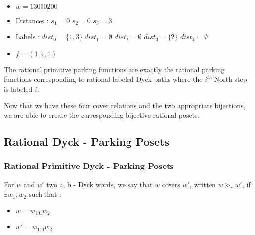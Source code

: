 \begin{example}[$a < b : a = 3, b = 5,
    \mathcal{LR}_{a,b} \to \mathcal{PF}_{a,b}$]
    ~\
    \begin{itemize}
        \item $w = 13000200$
    \end{itemize}
    
    \begin{itemize}
        \item Distances :
            \subitem $s_1 = 0$
            \hspace{2cm} $s_2 = 0$
            \hspace{2cm} $s_3 = 3$
        \item Labels :
            \subitem $dist_0 = \{1, 3\}$
            \hspace{2cm} $dist_1 = \emptyset$
            \hspace{2cm} $dist_2 = \emptyset$
            \subitem $dist_3 = \{2\}$
            \hspace{2cm} $dist_4 = \emptyset$
        \item $f = (1, 4, 1)$
    \end{itemize}
\end{example}

\begin{rem}
    The rational primitive parking functions are exactly the
    rational parking functions corresponding to rational labeled
    Dyck paths where the $i^{th}$ North step is labeled $i$.
\end{rem}

Now that we have these four cover relations and the two
appropriate bijections, we are able to create the 
corresponding bijective rational posets.

\subsection{Rational Dyck - Parking Posets}

\subsubsection{Rational Primitive Dyck - Parking Posets}

\begin{definition}[$\gtrdot_r$]
    For $w$ and $w'$ two a, b - Dyck words, we say that $w$
    covers $w'$, written $w \gtrdot_r w'$, if
    $\exists w_1, w_2$ such that :
    \begin{itemize}
        \item $w = w_101w_2$
        \item $w' = w_110w_2$
    \end{itemize}  
\end{definition}

